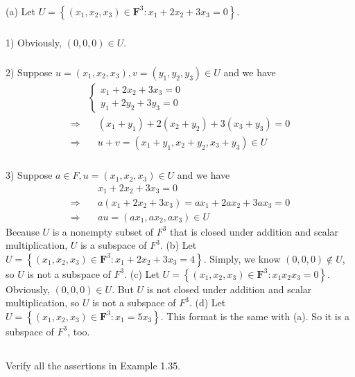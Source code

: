 \documentclass[a4paper]{article}
\begin{document}
\paragraph{}
(a) Let $U = \left\{\left(x_{1}, x_{2}, x_{3}\right) \in \mathbf{F}^{3}: x_{1}+2 x_{2}+3 x_{3}=0\right\}$.
\subparagraph{}
1) Obviously, $(0,0,0) \in U$.
\subparagraph{}
2) Suppose $u = (x_1,x_2,x_3), v = (y_1,y_2,y_3) \in U$ and we have
\[
    \begin{aligned}
                    &
        \begin{cases}
            x_1 + 2x_2 + 3x_3 = 0 \\
            y_1 + 2y_2 + 3y_3 = 0
        \end{cases}        \\
        \Rightarrow & \quad
        (x_1+y_1)+2(x_2+y_2)+3(x_3+y_3)=0 \\
        \Rightarrow & \quad
        u+v=(x_1+y_1,x_2+y_2,x_3+y_3) \in U
    \end{aligned}
\]
\subparagraph{}
3) Suppose $a\in F, u = (x_1,x_2,x_3)\in U$ and we have
\[
    \begin{aligned}
                    & \quad x_1+2x_2+3x_3=0 \\
        \Rightarrow & \quad
        a(x_1+2x_2+3x_3)=ax_1+2ax_2+3ax_3=0 \\
        \Rightarrow & \quad
        au = (ax_1,ax_2,ax_3) \in U
    \end{aligned}
\]
Because $U$ is a nonempty subset of $F^3$ that is closed
under addition and scalar multiplication, $U$ is a subspace of $F^3$.
\newline
\newline
(b) Let $U = \left\{\left(x_{1}, x_{2}, x_{3}\right) \in \mathbf{F}^{3}: x_{1}+2 x_{2}+3 x_{3}=4\right\}$.
Simply, we know $(0,0,0) \notin U$, so $U$ is not a subspace of $F^3$.
\newline
\newline
(c) Let $U = \left\{\left(x_{1}, x_{2}, x_{3}\right) \in \mathbf{F}^{3}: x_{1} x_{2} x_{3}=0\right\}$.
Obviously, $(0,0,0) \in U$. But $U$ is not closed under addition and scalar multiplication, so $U$ is not a subspace of $F^3$.
\newline
\newline
(d) Let $U = \left\{\left(x_{1}, x_{2}, x_{3}\right) \in \mathbf{F}^{3}: x_{1}=5 x_{3}\right\}$.
This format is the same with (a). So it is a subspace of $F^3$, too.

\subsection{}
Verify all the assertions in Example 1.35.
\end{document}
